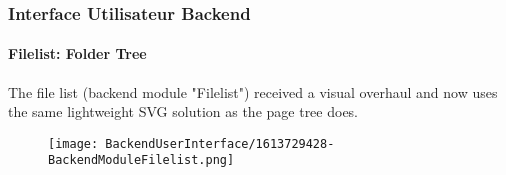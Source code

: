 %

\begin{frame}[fragile]
	\frametitle{Interface Utilisateur Backend}
	\framesubtitle{Filelist: Folder Tree}

	The file list (backend module "Filelist") received a visual overhaul and now
	uses the same lightweight SVG solution as the page tree does.

	\begin{figure}
		\texttt{[image: BackendUserInterface/1613729428-BackendModuleFilelist.png]}
	\end{figure}

\end{frame}

